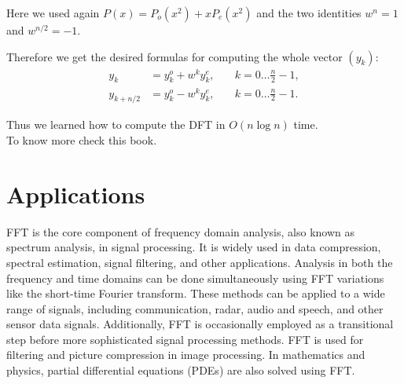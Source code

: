 \documentclass[28]{report}
\begin{document}
Here we used again $P(x) = P_o(x^2) + x P_e(x^2)$ and the two identities $w^n = 1$ and $w^{n/2} = -1$.

Therefore we get the desired formulas for computing the whole vector $(y_k)$:
\begin{align*} y_k &= y_k^o + w^k y_k^e, &\quad k = 0 \dots \frac{n}{2} - 1, \\ y_{k+n/2} &= y_k^o - w^k y_k^e, &\quad k = 0 \dots \frac{n}{2} - 1. \end{align*}

Thus we learned how to compute the DFT in $O(n \log n)$ time.\\
To know more check this\cite{fftbook1} book.

\chapter{Applications}
FFT is the core component of frequency domain analysis, also known as spectrum analysis, in signal processing. It is widely used in data compression, spectral estimation, signal filtering, and other applications. Analysis in both the frequency and time domains can be done simultaneously using FFT variations like the short-time Fourier transform. These methods can be applied to a wide range of signals, including communication, radar, audio and speech, and other sensor data signals. Additionally, FFT is occasionally employed as a transitional step before more sophisticated signal processing methods. FFT is used for filtering and picture compression in image processing. In mathematics and physics, partial differential equations (PDEs) are also solved using FFT.
\end{document}
